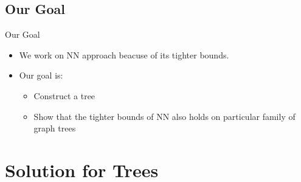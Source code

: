 \documentclass{beamer}
\begin{document}
\subsection{Our Goal}
% 
% 
\begin{frame}{Our Goal}
%  
%
\begin{itemize}
% 
% 
\item {
    We work on {\color{ao(english)} NN} approach beacuse of its tighter bounds.
}
% 
\item {
Our goal is:
% 
\begin{itemize}
    \item Construct a tree
    \item Show that the {\color{ao(english)}tighter bounds of NN} also holds on 
          particular family of graph trees
\end{itemize}    
}
% 
\end{itemize}
% 
% 
\end{frame}
% 
% 
% 
\section{Solution for Trees}
% 
% 
\end{document}
